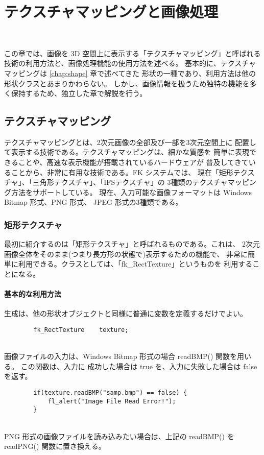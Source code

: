 \chapter{テクスチャマッピングと画像処理} \label{chap:imagetexture} ~

この章では、画像を 3D 空間上に表示する「テクスチャマッピング」と呼ばれる
技術の利用方法と、画像処理機能の使用方法を述べる。
基本的に、テクスチャマッピングは \ref{chap:shape} 章で述べてきた
形状の一種であり、利用方法は他の形状クラスとあまりかわらない。
しかし、画像情報を扱うため独特の機能を多く保持するため、独立した章で解説を行う。

\section{テクスチャマッピング} \label{sec:texture}
テクスチャマッピングとは、2次元画像の全部及び一部を3次元空間上に
配置して表示する技術である。テクスチャマッピングは、細かな質感を
簡単に表現できることや、高速な表示機能が搭載されているハードウェアが
普及してきていることから、非常に有用な技術である。FK システムでは、
現在「矩形テクスチャ」、「三角形テクスチャ」、「IFSテクスチャ」の
3種類のテクスチャマッピング方法をサポートしている。
現在、入力可能な画像フォーマットは Windows Bitmap 形式、PNG 形式、
JPEG 形式の3種類である。

\subsection{矩形テクスチャ}
最初に紹介するのは「矩形テクスチャ」と呼ばれるものである。これは、
2次元画像全体をそのまま(つまり長方形の状態で)表示するための機能で、
非常に簡単に利用できる。クラスとしては、「fk\_RectTexture」というものを
利用することになる。

\subsubsection{基本的な利用方法}
生成は、他の形状オブジェクトと同様に普通に変数を定義するだけでよい。
\\
\begin{screen}
\begin{verbatim}
        fk_RectTexture    texture;
\end{verbatim}
\end{screen}
~ \\
画像ファイルの入力は、Windows Bitmap 形式の場合 readBMP() 関数を用いる。
この関数は、入力に
成功した場合は true を、入力に失敗した場合は false を返す。
\\
\begin{breakbox}
\begin{verbatim}
        if(texture.readBMP("samp.bmp") == false) {
            fl_alert("Image File Read Error!");
        }
\end{verbatim}
\end{breakbox}
~ \\
PNG 形式の画像ファイルを読み込みたい場合は、上記の readBMP() を
readPNG() 関数に置き換える。

